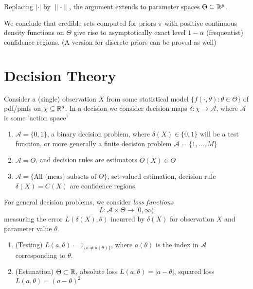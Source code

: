 \documentclass[a4paper]{article}
\begin{document}
Replacing $|\cdot |$ by $\|\cdot \|$, the argument extends to parameter spaces $\Theta \subseteq \mathbb{R}^{p}$.

We conclude that credible sets computed for priors $\pi$ with positive continuous density functions on $\Theta$ give rise to asymptotically exact level $1- \alpha$ (frequentist) confidence regions. (A version for discrete priors can be proved as well)

\section{Decision Theory}

Consider a (single) observation $X$ from some statistical model $\{f\left( \cdot , \theta \right) : \theta \in \Theta \}$ of pdf/pmfs on $\chi \subseteq \mathbb{R}^{d}$. In a decision we consider decision maps $\delta : \chi \to \mathcal{A}$, where $\mathcal{A}$ is some 'action space'

\begin{eg}
	\begin{enumerate}[label=\roman*)]
		\item $\mathcal{A} = \{0,1\} $, a binary decision problem, where $\delta(X) \in \{0,1\} $ will be a test function, or more generally a finite decision problem $\mathcal{A} = \{1,\ldots,M\} $
		\item $\mathcal{A} = \Theta$, and decision rules are estimators $\hat{\Theta}(X) \in  \Theta$
		\item $\mathcal{A} = \{ \text{All (meas) subsets of } \Theta\} $, set-valued estimation, decision rule $\delta(X) = C(X)$ are confidence regions.
	\end{enumerate}
\end{eg}

For general decision problems, we consider \textit{loss functions}
\[
	L: \mathcal{A} \times  \Theta \to [0, \infty)
\] 
measuring the error $L(\delta(X), \theta)$ incurred by  $\delta(X)$ for observation $X$ and parameter value $\theta$.

\begin{eg}

	\begin{enumerate}[label=\roman*)]
		\item (Testing) $L(a,\theta) = 1_{\{a \neq  a(\theta)\} }$, where $a(\theta)$ is the index in $\mathcal{A}$ corresponding to $\theta$.
		\item (Estimation) $\Theta \subset \mathbb{R}$, absolute loss $L(a,\theta) = |a-\theta|$, squared loss $L(a,\theta) = (a-\theta)^2$
	\end{enumerate}
\end{eg}
\end{document}
